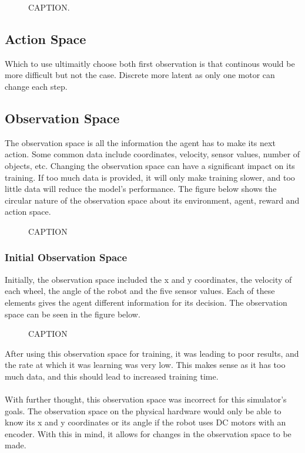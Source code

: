 \documentclass[a4paper,11pt]{article}
\begin{document}
 \begin{figure}[H]
 \label{fig:}
 \centering
 \caption{CAPTION.}
 \end{figure}

\subsection{Action Space}
Which to use ultimaitly choose both first observation is that continous would be more difficult but not the case. Discrete more latent as only one motor can change each step. 

\subsection{Observation Space}
The observation space is all the information the agent has to make its next action. Some common data include coordinates, velocity, sensor values, number of objects, etc. Changing the observation space can have a significant impact on its training. If too much data is provided, it will only make training slower, and too little data will reduce the model's performance. The figure below shows the circular nature of the observation space about its environment, agent, reward and action space.

\begin{figure}[H]
\label{fig:}
\centering
\caption{CAPTION}
\end{figure}

 

\subsubsection{Initial Observation Space}

Initially, the observation space included the x and y coordinates, the velocity of each wheel, the angle of the robot and the five sensor values. Each of these elements gives the agent different information for its decision. The observation space can be seen in the figure below.

\begin{figure}[H]
\label{fig:}
\centering
\caption{CAPTION}
\end{figure}

 
After using this observation space for training, it was leading to poor results, and the rate at which it was learning was very low. This makes sense as it has too much data, and this should lead to increased training time.
\\\\
With further thought, this observation space was incorrect for this simulator's goals. The observation space on the physical hardware would only be able to know its x and y coordinates or its angle if the robot uses DC motors with an encoder. With this in mind, it allows for changes in the observation space to be made.
\end{document}
